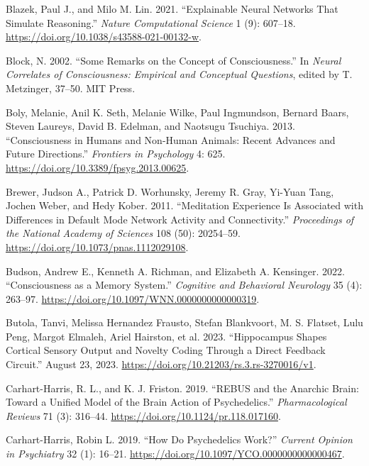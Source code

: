 \documentclass[
  a4paper]{article}
\newlength{\cslhangindent}
\newenvironment{CSLReferences}[2] %
 {\begin{list}{}{%
  \setlength{\itemindent}{0pt}
  \setlength{\leftmargin}{0pt}
  \setlength{\parsep}{0pt}
  \ifodd #1
   \setlength{\leftmargin}{\cslhangindent}
   \setlength{\itemindent}{-1\cslhangindent}
  \fi
  \setlength{\itemsep}{#2\baselineskip}}}
 {\end{list}}
\begin{document}
\begin{CSLReferences}{1}{0}
Blazek, Paul J., and Milo M. Lin. 2021. {``Explainable Neural Networks
That Simulate Reasoning.''} \emph{Nature Computational Science} 1 (9):
607--18. \url{https://doi.org/10.1038/s43588-021-00132-w}.

Block, N. 2002. {``Some Remarks on the Concept of Consciousness.''} In
\emph{Neural {Correlates} of {Consciousness}: {Empirical} and
{Conceptual Questions}}, edited by T. Metzinger, 37--50. MIT Press.

Boly, Melanie, Anil K. Seth, Melanie Wilke, Paul Ingmundson, Bernard
Baars, Steven Laureys, David B. Edelman, and Naotsugu Tsuchiya. 2013.
{``Consciousness in Humans and Non-Human Animals: Recent Advances and
Future Directions.''} \emph{Frontiers in Psychology} 4: 625.
\url{https://doi.org/10.3389/fpsyg.2013.00625}.

Brewer, Judson A., Patrick D. Worhunsky, Jeremy R. Gray, Yi-Yuan Tang,
Jochen Weber, and Hedy Kober. 2011. {``Meditation Experience Is
Associated with Differences in Default Mode Network Activity and
Connectivity.''} \emph{Proceedings of the National Academy of Sciences}
108 (50): 20254--59. \url{https://doi.org/10.1073/pnas.1112029108}.

Budson, Andrew E., Kenneth A. Richman, and Elizabeth A. Kensinger. 2022.
{``Consciousness as a Memory System.''} \emph{Cognitive and Behavioral
Neurology} 35 (4): 263--97.
\url{https://doi.org/10.1097/WNN.0000000000000319}.

Butola, Tanvi, Melissa Hernandez Frausto, Stefan Blankvoort, M. S.
Flatset, Lulu Peng, Margot Elmaleh, Ariel Hairston, et al. 2023.
{``Hippocampus Shapes Cortical Sensory Output and Novelty Coding Through
a Direct Feedback Circuit.''} August 23, 2023.
\url{https://doi.org/10.21203/rs.3.rs-3270016/v1}.

Carhart-Harris, R. L., and K. J. Friston. 2019. {``{REBUS} and the
Anarchic Brain: Toward a Unified Model of the Brain Action of
Psychedelics.''} \emph{Pharmacological Reviews} 71 (3): 316--44.
\url{https://doi.org/10.1124/pr.118.017160}.

Carhart-Harris, Robin L. 2019. {``How Do Psychedelics Work?''}
\emph{Current Opinion in Psychiatry} 32 (1): 16--21.
\url{https://doi.org/10.1097/YCO.0000000000000467}.


\end{CSLReferences}
\end{document}
